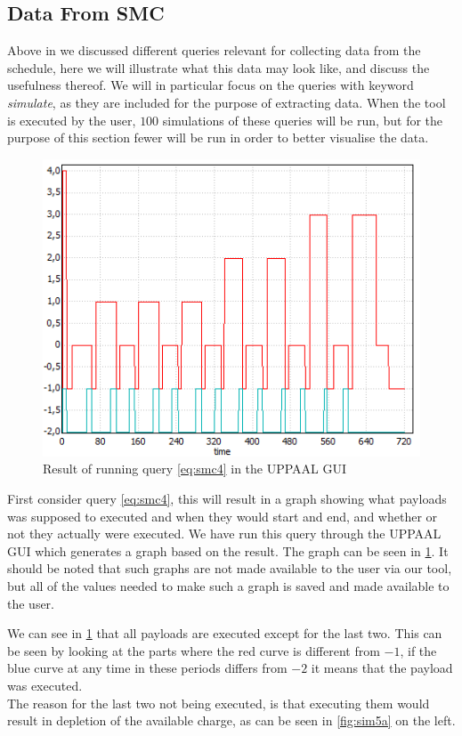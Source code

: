 \subsection{Data From SMC}
Above in  we discussed different queries relevant for collecting data from the schedule, here we will illustrate what this data may look like, and discuss the usefulness thereof.
We will in particular focus on the queries with keyword \textit{simulate}, as they are included for the purpose of extracting data.
When the tool is executed by the user, $100$ simulations of these queries will be run, but for the purpose of this section fewer will be run in order to better visualise the data. 

\begin{figure}[h]
	\centering
	\includegraphics[scale=0.8]{graphics/active_running.png}
	\caption{Result of running query \ref{eq:smc4} in the UPPAAL GUI}
	\label{fig:active_running}
\end{figure}
First consider query \ref{eq:smc4}, this will result in a graph showing what payloads was supposed to executed and when they would start and end, and whether or not they actually were executed.
We have run this query through the UPPAAL GUI which generates a graph based on the result. 
The graph can be seen in \cref{fig:active_running}.
It should be noted that such graphs are not made available to the user via our tool, but all of the values needed to make such a graph is saved and made available to the user.

We can see in \cref{fig:active_running} that all payloads are executed except for the last two.
This can be seen by looking at the parts where the red curve is different from $-1$, if the blue curve at any time in these periods differs from $-2$ it means that the payload was executed.\\
The reason for the last two not being executed, is that executing them would result in depletion of the available charge, as can be seen in \cref{fig:sim5a} on the left. 

